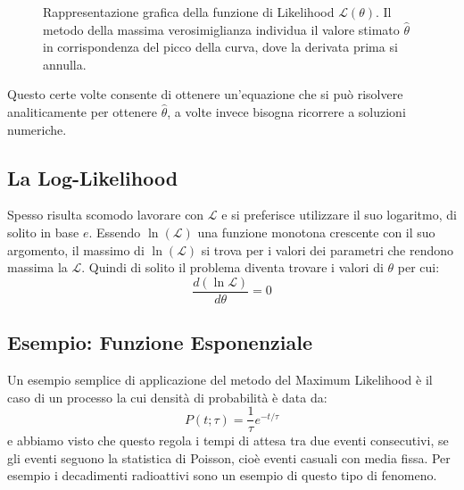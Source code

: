 \documentclass[openany,a4paper,12pt]{book}
\providecommand{\mathscr}[1]{\mathcal{#1}}
\theoremstyle{remark}
\begin{document}
\begin{figure}[H]
\centering
{}
\caption{Rappresentazione grafica della funzione di Likelihood $\mathscr{L}(\theta)$. Il metodo della massima verosimiglianza individua il valore stimato $\hat{\theta}$ in corrispondenza del picco della curva, dove la derivata prima si annulla.}
\end{figure}

 Questo certe volte consente di ottenere un'equazione che si può risolvere analiticamente per ottenere $\hat{\theta}$, a volte invece bisogna ricorrere a soluzioni numeriche.

\subsection*{La Log-Likelihood}
Spesso risulta scomodo lavorare con $\mathscr{L}$ e si preferisce utilizzare il suo logaritmo, di solito in base $e$. Essendo $\ln(\mathscr{L})$ una funzione monotona crescente con il suo argomento, il massimo di $\ln(\mathscr{L})$ si trova per i valori dei parametri che rendono massima la $\mathscr{L}$.
Quindi di solito il problema diventa trovare i valori di $\theta$ per cui:
\begin{equation}
\frac{d(\ln \mathscr{L})}{d\theta} = 0
\end{equation}

\subsection*{Esempio: Funzione Esponenziale}
Un esempio semplice di applicazione del metodo del Maximum Likelihood è il caso di un processo la cui densità di probabilità è data da:
\begin{equation}
P(t ; \tau) = \frac{1}{\tau} e^{-t/\tau}
\end{equation}
e abbiamo visto che questo regola i tempi di attesa tra due eventi consecutivi, se gli eventi seguono la statistica di Poisson, cioè eventi casuali con media fissa. Per esempio i decadimenti radioattivi sono un esempio di questo tipo di fenomeno.
\end{document}
